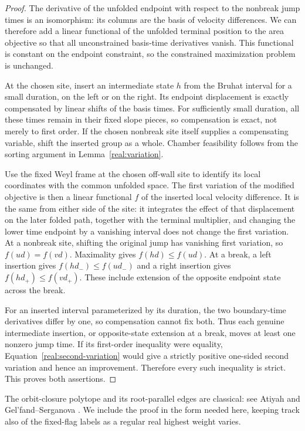 \begin{proof}
The derivative of the unfolded endpoint with respect to the nonbreak
jump times is an isomorphism: its columns are the basis of velocity
differences.  We can therefore add a linear functional of the
unfolded terminal position to the area objective so that all
unconstrained basis-time derivatives vanish.  This functional is
constant on the endpoint constraint, so the constrained maximization
problem is unchanged.

At the chosen site, insert an intermediate state $h$ from the Bruhat
interval for a small duration, on the left or on the right.  Its
endpoint displacement is exactly compensated by linear shifts of
the basis times.  For sufficiently small duration, all these times
remain in their fixed slope pieces, so compensation is exact, not
merely to first order.  If the chosen nonbreak site itself supplies
a compensating variable, shift the inserted group as a whole.
Chamber feasibility follows from the sorting argument in
Lemma~\ref{real:variation}.

Use the fixed Weyl frame at the chosen off-wall site to identify
its local coordinates with the common unfolded space.  The first
variation of the modified objective is then a linear functional $f$
of the inserted local velocity difference.  It is the same
from either side of the site: it integrates the effect of that
displacement on the later folded path, together with the terminal
multiplier, and changing the lower time endpoint by a vanishing
interval does not change the first variation.  At a nonbreak site,
shifting the original jump has vanishing first variation, so
$f(ud)=f(vd)$.  Maximality gives $f(hd)\le f(ud)$.
At a break, a left insertion gives
$f(hd_-)\le f(ud_-)$ and a right insertion gives
$f(hd_+)\le f(vd_+)$.  These include extension of the opposite
endpoint state across the break.

For an inserted interval parameterized by its duration, the two
boundary-time derivatives differ by one, so compensation cannot fix
both.  Thus each genuine intermediate insertion, or opposite-state
extension at a break, moves at least one nonzero jump time.  If its first-order
inequality were equality, Equation~\eqref{real:second-variation}
would give a strictly positive one-sided second variation and hence
an improvement.  Therefore every such inequality is strict.  This
proves both assertions.
\end{proof}

The orbit-closure polytope and its root-parallel edges are classical:
see Atiyah \cite[Theorem~2]{Atiyah82} and Gel'fand--Serganova
\cite[Section~7.1, Theorem~1]{GeS87}. We include the proof in the form
needed here, keeping track also of the fixed-flag labels as a regular
real highest weight varies.

